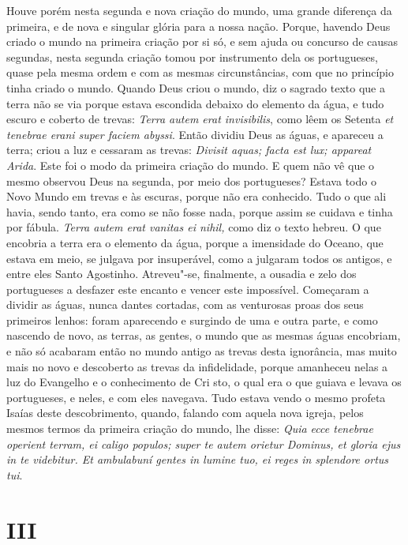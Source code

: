 Houve porém nesta segunda e nova criação do mundo, uma grande diferença
da primeira, e de nova e singular glória para a nossa nação. Porque,
havendo Deus criado o mundo na primeira criação por si só, e sem ajuda
ou concurso de causas segundas, nesta segunda criação tomou por
instrumento dela os portugueses, quase pela mesma ordem e com as mesmas
circunstâncias, com que no princípio tinha criado o mundo.
Quando Deus criou o mundo, diz o sagrado texto que a terra não se via
porque estava escondida debaixo do elemento da água, e tudo escuro e
coberto de trevas: \emph{Terra autem erat invisibilis}, como lêem os
Setenta \emph{et tenebrae erani super faciem abyssi}. Então dividiu Deus as águas, e apareceu a terra; criou a luz e cessaram as trevas: \emph{Divisit aquas;
facta est lux; appareat Arida}. Este foi o modo da
primeira criação do mundo. E quem não vê que o mesmo observou Deus na
segunda, por meio
dos portugueses? Estava todo o Novo Mundo em trevas e às escuras, porque
não era conhecido. Tudo o que ali havia, sendo tanto, era como se não
fosse nada, porque assim se cuidava e tinha por fábula. \emph{Terra
autem erat vanitas ei nihil,} como diz o texto hebreu.
O que encobria a terra era o elemento da água, porque a
imensidade do Oceano, que estava em meio, se julgava por insuperável,
como a julgaram todos os antigos, e entre eles Santo Agostinho.
Atreveu"-se, finalmente, a ousadia e zelo dos portugueses a desfazer este
encanto e vencer este impossível. Começaram a dividir as águas, nunca
dantes cortadas, com as venturosas proas dos seus primeiros lenhos:
foram aparecendo e surgindo de uma e outra parte, e como nascendo de
novo, as terras, as gentes, o mundo que as mesmas águas encobriam, e não
só acabaram então no mundo antigo as trevas desta ignorância, mas muito
mais no novo e descoberto as trevas da infidelidade, porque amanheceu
nelas a luz do Evangelho e o conhecimento de Cri sto, o qual era o que
guiava e levava os portugueses, e neles, e com eles navegava. Tudo
estava vendo o mesmo profeta Isaías deste descobrimento, quando, falando
com aquela nova igreja, pelos mesmos termos da primeira criação do
mundo, lhe disse: \emph{Quia ecce tenebrae operient terram, ei caligo
populos; super te autem orietur Dominus, et gloria ejus in te videbitur.
Et ambulabuní gentes in lumine tuo, ei reges in splendore ortus
tui}.

\section{III}

